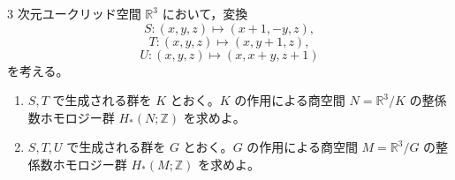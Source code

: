 \documentclass[12pt]{jlreq}
\newcommand{\R}{\mathbb{R}}
\newcommand{\Z}{\mathbb{Z}}
\begin{document}
\(3\) 次元ユークリッド空間 \(\R^3\) において，変換
\[
  S:(x,y,z)\mapsto (x+1,-y,z),
\]
\[
  T:(x,y,z)\mapsto (x,y+1,z),
\]
\[
  U:(x,y,z)\mapsto (x,x+y,z+1)
\]
を考える。

\begin{enumerate}
  \item \(S,T\) で生成される群を \(K\) とおく。\(K\) の作用による商空間
  \(N=\R^3/K\) の整係数ホモロジー群 \(H_*(N;\Z)\) を求めよ。
  \item \(S,T,U\) で生成される群を \(G\) とおく。\(G\) の作用による商空間
  \(M=\R^3/G\) の整係数ホモロジー群 \(H_*(M;\Z)\) を求めよ。
\end{enumerate}
\end{document}
